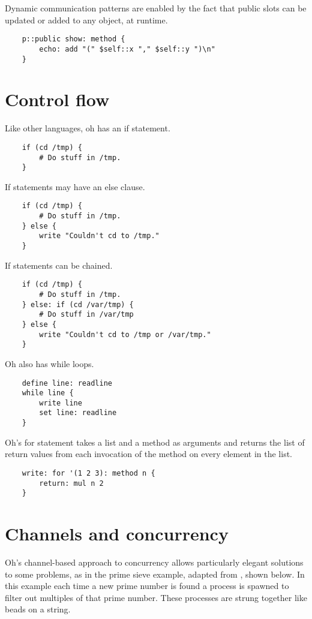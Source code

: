 \documentclass[12pt]{book}
\begin{document}
Dynamic communication patterns are enabled by the fact that public slots
can be updated or added to any object, at runtime.

\begin{lstlisting}
	p::public show: method {
		echo: add "(" $self::x "," $self::y ")\n"
	}
\end{lstlisting}


\section{Control flow}

Like other languages, oh has an if statement.

\begin{lstlisting}
	if (cd /tmp) {
		# Do stuff in /tmp.
	}
\end{lstlisting}

If statements may have an else clause.

\begin{lstlisting}
	if (cd /tmp) {
		# Do stuff in /tmp.
	} else {
		write "Couldn't cd to /tmp."
	}
\end{lstlisting}

If statements can be chained.

\begin{lstlisting}
	if (cd /tmp) {
		# Do stuff in /tmp.
	} else: if (cd /var/tmp) {
		# Do stuff in /var/tmp
	} else {
		write "Couldn't cd to /tmp or /var/tmp."
	}
\end{lstlisting}

Oh also has while loops.

\begin{lstlisting}
	define line: readline
	while line {
		write line
		set line: readline
	}
\end{lstlisting}

Oh's for statement takes a list and a method as arguments and returns the
list of return values from each invocation of the method on every element
in the list.

\begin{lstlisting}
	write: for '(1 2 3): method n {
	    return: mul n 2
	}
\end{lstlisting}


\section{Channels and concurrency}

Oh's channel-based approach to concurrency allows particularly elegant
solutions to some problems, as in the prime sieve example, adapted
from \cite{NALfCwM}, shown below. In this example each time a new prime
number is found a process is spawned to filter out multiples of that
prime number. These processes are strung together like beads on a string.
\end{document}
